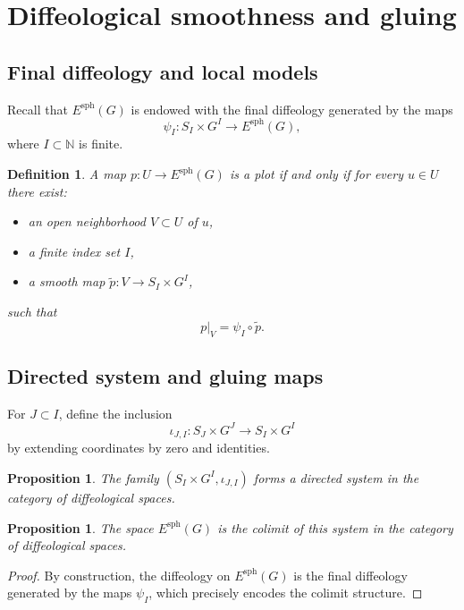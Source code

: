 \documentclass[11pt]{amsart}
\newtheorem{proposition}[theorem]{Proposition}
\newtheorem{definition}[theorem]{Definition}
\begin{document}
\section{Diffeological smoothness and gluing} \label{4}

\subsection{Final diffeology and local models}

Recall that $E^{\mathrm{sph}}(G)$ is endowed with the final diffeology generated by the maps
\[
\psi_I : S_I \times G^I \longrightarrow E^{\mathrm{sph}}(G),
\]
where $I \subset \mathbb{N}$ is finite.

\begin{definition}
A map $p : U \to E^{\mathrm{sph}}(G)$ is a plot if and only if for every $u \in U$ there exist:
\begin{itemize}
\item an open neighborhood $V \subset U$ of $u$,
\item a finite index set $I$,
\item a smooth map $\widetilde p : V \to S_I \times G^I$,
\end{itemize}
such that
\[
p|_V = \psi_I \circ \widetilde p.
\]
\end{definition}

\subsection{Directed system and gluing maps}

For $J \subset I$, define the inclusion
\[
\iota_{J,I} : S_J \times G^J \longrightarrow S_I \times G^I
\]
by extending coordinates by zero and identities.

\begin{proposition}
The family $(S_I \times G^I, \iota_{J,I})$ forms a directed system in the category of diffeological spaces.
\end{proposition}

\begin{proposition}
The space $E^{\mathrm{sph}}(G)$ is the colimit of this system in the category of diffeological spaces.
\end{proposition}

\begin{proof}
By construction, the diffeology on $E^{\mathrm{sph}}(G)$ is the final diffeology generated by the maps $\psi_I$, which precisely encodes the colimit structure.
\end{proof}
\end{document}
